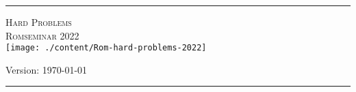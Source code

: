 \begin{titlepage}
	\newcommand{\HRule}{\rule{\linewidth}{.25mm}}
	\HRule
	\vspace*{10pt}
	\begin{center}
	  {\Huge\scshape Hard Problems \\[5mm]
				Romseminar 2022 \\ }
	\vspace{2cm}
	\texttt{[image: ./content/Rom-hard-problems-2022]}
	
	  {Version: \today }
	\end{center}
	\HRule
	\begin{center}
	\end{center}
\end{titlepage}
